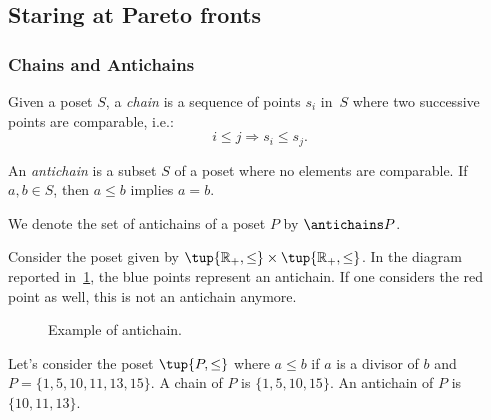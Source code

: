 \subsection{Staring at Pareto fronts}

\subsubsection{Chains and Antichains} \label{sec:chains-antichains}


\begin{definition}
\label{def:chain}
Given a poset $S$, a \emph{chain} is a sequence of points ${s_i}$ in~$S$ where two successive points are comparable, i.e.:
\begin{equation}
    i \leq j \Rightarrow s_i \leq s_j.
\end{equation}
\end{definition}

 
\begin{definition}
\label{def:antichain}
An \emph{antichain} is a subset $S$ of a poset where no elements are comparable. If $a,b \in S$, then $a \leq b$ implies $a=b$.
\end{definition}
\begin{remark}
We denote the set of antichains of a poset $P$ by $\antichains P$.
\end{remark}

\begin{example}
\label{ex:graphicantichain}
Consider the poset given by $\tup{\mathbb{R}_+,\leq}\times \tup{\mathbb{R}_+,\leq}$. In the diagram reported in~\cref{fig:antichain}, the blue points represent an antichain. If one considers the red point as well, this is not an antichain anymore. 

\begin{figure}[h!]
\begin{center}
\end{center}
\caption{Example of antichain. \label{fig:antichain}}
\end{figure}
\end{example}

\begin{example}
Let's consider the poset $\tup{P,\leq}$ where $a\leq b$ if $a$ is a divisor of $b$ and $P=\{1,5,10,11,13,15\}$. A chain of $P$ is $\{1,5,10,15\}$. An antichain of $P$ is $\{10,11,13\}$.
\end{example}

